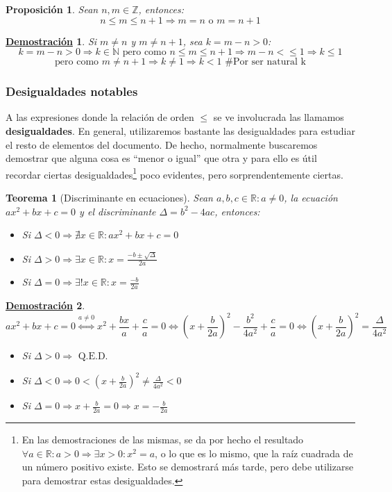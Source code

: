 \documentclass[10pt,a4paper,openright]{book}
\theoremstyle{break}
\newtheorem{theo}{Teorema}[chapter]
\newtheorem{prop}{Proposición}[chapter]
\newtheorem*{demo}{\underline{Demostración}}
\begin{document}
\begin{prop}
Sean $n, m\in \mathbb Z$, entonces:
\[
n\leq m \leq n+1 \Rightarrow m = n \text{ o } m = n+1
\]
\end{prop}
\begin{demo}
Si $m\neq n$ y $m\neq n+1$, sea $k=m-n>0$:
$$k=m-n>0\Rightarrow k\in \mathbb N \mbox{ pero como }n\leq m \leq n+1\Rightarrow m-n<\leq 1 \Rightarrow k\leq 1$$
$$\mbox{ pero como }m\neq n+1\Rightarrow k\neq 1\Rightarrow k<1\mbox{ \# Por ser natural k }$$
\end{demo}

\subsubsection{Desigualdades notables}
A las expresiones donde la relación de orden $\leq$ se ve involucrada las llamamos \textbf{desigualdades}. En general, utilizaremos bastante las desigualdades para estudiar el resto de elementos del documento. De hecho, normalmente buscaremos demostrar que alguna cosa es ``menor o igual'' que otra y para ello es útil recordar ciertas desigualdades\footnote{En las demostraciones de las mismas, se da por hecho el resultado $\forall a\in \mathbb R : a>0 \Rightarrow \exists x>0 : x^2=a$, o lo que es lo mismo, que la raíz cuadrada de un número positivo existe. Esto se demostrará más tarde, pero debe utilizarse para demostrar estas desigualdades.} poco evidentes, pero sorprendentemente ciertas.

\begin{theo}[Discriminante en ecuaciones]
Sean $a,b,c\in \mathbb R  : a\neq 0$, la ecuación $ax^2+bx+c=0$ y el discriminante $\Delta=b^2-4ac$, entonces:
\begin{itemize}
\item Si $\Delta<0\Rightarrow \nexists x\in \mathbb R : ax^2+bx+c=0$
\item Si $\Delta>0 \Rightarrow \exists x\in \mathbb R : x=\frac{-b\pm\sqrt{\Delta}}{2a}$
\item Si $\Delta=0 \Rightarrow \exists! x\in \mathbb R : x=\frac{-b}{2a}$
\end{itemize}
\end{theo}
\begin{demo}
$$ax^2+bx+c=0\stackrel{a\neq 0}{\Leftrightarrow} x^2+\frac{bx}{a}+\frac{c}{a}=0\Leftrightarrow (x+\frac{b}{2a})^2-\frac{b^2}{4a^2}+\frac{c}{a}=0\Leftrightarrow (x+\frac{b}{2a})^2=\frac{\Delta}{4a^2}$$
\begin{itemize}
\item Si $\Delta>0\Rightarrow \mbox{ Q.E.D.}$
\item Si $\Delta<0\Rightarrow 0<(x+\frac{b}{2a})^2 \neq \frac{\Delta}{4a^2}<0$
\item Si $\Delta=0\Rightarrow x+\frac{b}{2a}=0\Rightarrow x=-\frac{b}{2a}$
\end{itemize}
\end{demo}
\end{document}

